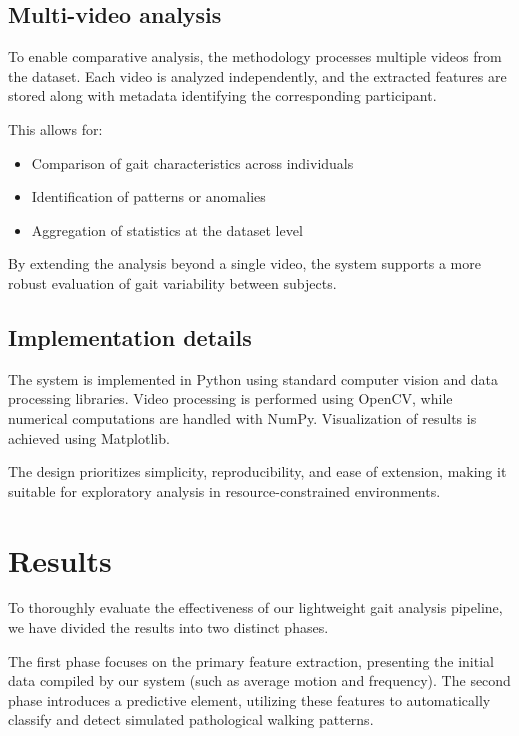 \documentclass[12pt,a4paper]{article} %
\begin{document}
\subsection{Multi-video analysis}
To enable comparative analysis, the methodology processes multiple videos from the dataset. Each video is analyzed independently, and the extracted features are stored along with metadata identifying the corresponding participant.

This allows for:
\begin{itemize}
  \item Comparison of gait characteristics across individuals
  \item Identification of patterns or anomalies
  \item Aggregation of statistics at the dataset level
\end{itemize}

By extending the analysis beyond a single video, the system supports a more robust evaluation of gait variability between subjects.

\subsection{Implementation details}
The system is implemented in Python using standard computer vision and data processing libraries. Video processing is performed using OpenCV, while numerical computations are handled with NumPy. Visualization of results is achieved using Matplotlib.

The design prioritizes simplicity, reproducibility, and ease of extension, making it suitable for exploratory analysis in resource-constrained environments.
\clearpage

\clearpage

\section{Results}
To thoroughly evaluate the effectiveness of our lightweight gait analysis pipeline, we have divided the results into two distinct phases. 

The first phase focuses on the primary feature extraction, presenting the initial data compiled by our system (such as average motion and frequency). The second phase introduces a predictive element, utilizing these features to automatically classify and detect simulated pathological walking patterns.
\end{document}
